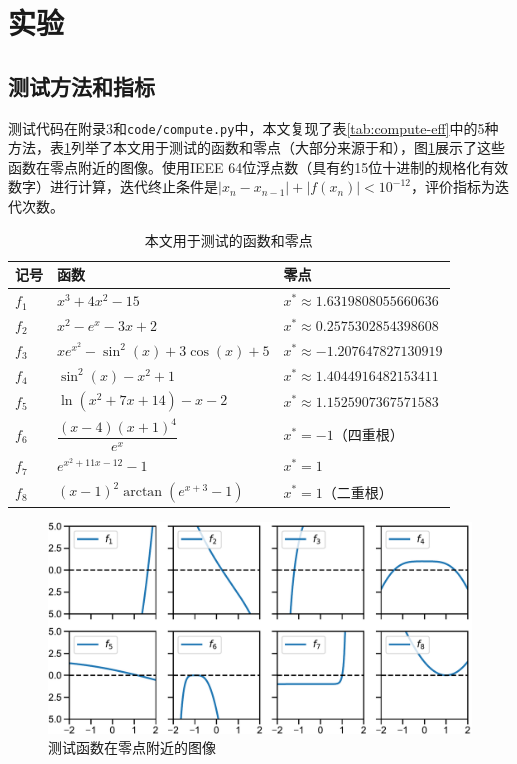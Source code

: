 
\section{实验}

\subsection{测试方法和指标}

测试代码在附录3和\texttt{code/compute.py}中，本文复现了表\ref{tab:compute-eff}中的5种方法，表\ref{tab:eval-func}列举了本文用于测试的函数和零点（大部分来源于\cite{kou2006modified}和\cite{chun2012new}），图\ref{fig:eval-func}展示了这些函数在零点附近的图像。使用IEEE 64位浮点数（具有约15位十进制的规格化有效数字）进行计算，迭代终止条件是$|x_{n} - x_{n-1}| + |f(x_n)| < 10^{-12}$，评价指标为迭代次数。



\begin{table}[!htb]
    \centering
    \caption{本文用于测试的函数和零点}
    \label{tab:eval-func}
    \begin{tabular}{lll}
        \toprule
        记号 & 函数 & 零点\\
        \midrule
        $f_1$ & $x^3+4x^2-15$ & $x^*\approx 1.6319808055660636 $ \\
        $f_2$ & $x^2 - e^x - 3x + 2$ & $x^* \approx 0.2575302854398608$ \\
        $f_3$ & $xe^{x^2} - \sin^2(x) + 3\cos(x) + 5$ & $x^*\approx -1.207647827130919$ \\
        $f_4$ & $\sin^2(x) - x^2 + 1$ & $x^*\approx 1.4044916482153411 $ \\
        $f_5$ & $\ln(x^2 + 7x+ 14) - x - 2$ & $x^* \approx 1.1525907367571583$ \\
        $f_6$ & $\dfrac{(x - 4)(x + 1)^4}{e^x}$ & $x^*=-1$（四重根） \\
        $f_7$ & $e^{x^{2} + 11 x - 12} - 1$ & $x^*= 1$ \\
        $f_8$ & $(x - 1)^2\arctan(e^{x + 3} - 1)$ & $x^*= 1$（二重根） \\
        \bottomrule
    \end{tabular}    
\end{table}


\begin{figure}[!htb]
    \centering
    \includegraphics[width=.9\linewidth]{figure/eval-func.pdf}
    \caption{测试函数在零点附近的图像}
    \label{fig:eval-func}
\end{figure}


